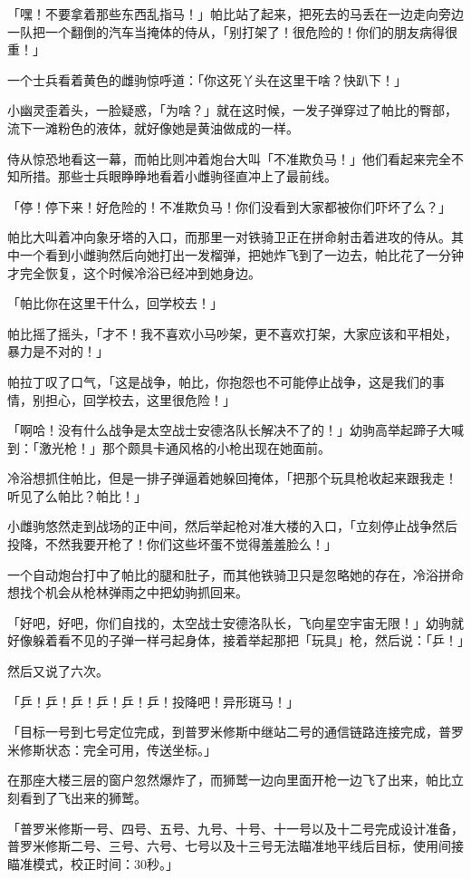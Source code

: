 「嘿！不要拿着那些东西乱指马！」帕比站了起来，把死去的马丢在一边走向旁边一队把一个翻倒的汽车当掩体的侍从，「别打架了！很危险的！你们的朋友病得很重！」

一个士兵看着黄色的雌驹惊呼道：「你这死丫头在这里干啥？快趴下！」

小幽灵歪着头，一脸疑惑，「为啥？」就在这时候，一发子弹穿过了帕比的臀部，流下一滩粉色的液体，就好像她是黄油做成的一样。

侍从惊恐地看这一幕，而帕比则冲着炮台大叫「不准欺负马！」他们看起来完全不知所措。那些士兵眼睁睁地看着小雌驹径直冲上了最前线。

「停！停下来！好危险的！不准欺负马！你们没看到大家都被你们吓坏了么？」

帕比大叫着冲向象牙塔的入口，而那里一对铁骑卫正在拼命射击着进攻的侍从。其中一个看到小雌驹然后向她打出一发榴弹，把她炸飞到了一边去，帕比花了一分钟才完全恢复，这个时候冷浴已经冲到她身边。

「帕比你在这里干什么，回学校去！」

帕比摇了摇头，「才不！我不喜欢小马吵架，更不喜欢打架，大家应该和平相处，暴力是不对的！」

帕拉丁叹了口气，「这是战争，帕比，你抱怨也不可能停止战争，这是我们的事情，别担心，回学校去，这里很危险！」

「啊哈！没有什么战争是太空战士安德洛队长解决不了的！」幼驹高举起蹄子大喊到：「激光枪！」那个颇具卡通风格的小枪出现在她面前。

冷浴想抓住帕比，但是一排子弹逼着她躲回掩体，「把那个玩具枪收起来跟我走！听见了么帕比？帕比！」

小雌驹悠然走到战场的正中间，然后举起枪对准大楼的入口，「立刻停止战争然后投降，不然我要开枪了！你们这些坏蛋不觉得羞羞脸么！」

一个自动炮台打中了帕比的腿和肚子，而其他铁骑卫只是忽略她的存在，冷浴拼命想找个机会从枪林弹雨之中把幼驹抓回来。

「好吧，好吧，你们自找的，太空战士安德洛队长，飞向星空宇宙无限！」幼驹就好像躲着看不见的子弹一样弓起身体，接着举起那把「玩具」枪，然后说：「乒！」

然后又说了六次。

「乒！乒！乒！乒！乒！乒！投降吧！异形斑马！」

「{\mt 目标一号到七号定位完成，到普罗米修斯中继站二号的通信链路连接完成，普罗米修斯状态：完全可用，传送坐标。}」

在那座大楼三层的窗户忽然爆炸了，而狮鹫一边向里面开枪一边飞了出来，帕比立刻看到了飞出来的狮鹫。

「{\mt 普罗米修斯一号、四号、五号、九号、十号、十一号以及十二号完成设计准备，普罗米修斯二号、三号、六号、七号以及十三号无法瞄准地平线后目标，使用间接瞄准模式，校正时间：30秒。}」

